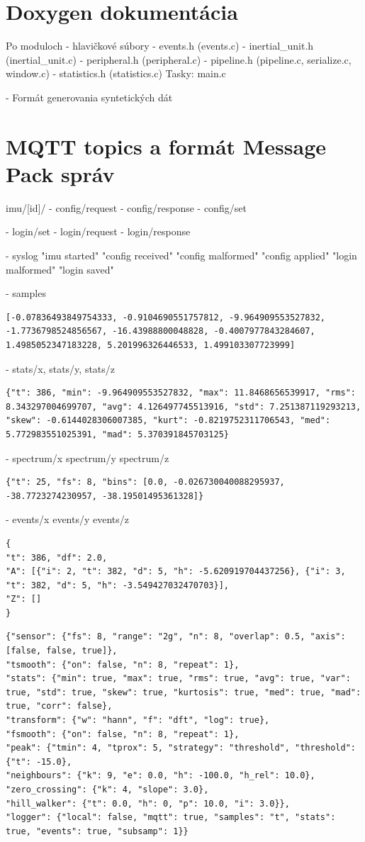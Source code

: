 \section{Doxygen dokumentácia}
Po moduloch - hlavičkové súbory
- events.h  (events.c)
- inertial\_unit.h (inertial\_unit.c)
- peripheral.h  (peripheral.c)
- pipeline.h (pipeline.c, serialize.c, window.c)
- statistics.h (statistics.c)
Tasky: main.c

- Formát generovania syntetických dát

\section{MQTT topics a formát Message Pack správ}
imu/[id]/
- config/request
- config/response
- config/set

- login/set
- login/request
- login/response

- syslog
	"imu started"
	"config received"
	"config malformed"
	"config applied"
	"login malformed"
	"login saved"

- samples
\begin{verbatim}
[-0.07836493849754333, -0.9104690551757812, -9.964909553527832, -1.7736798524856567, -16.43988800048828, -0.4007977843284607, 1.4985052347183228, 5.201996326446533, 1.499103307723999]
\end{verbatim}

- stats/x, stats/y, stats/z
\begin{verbatim}
{"t": 386, "min": -9.964909553527832, "max": 11.8468656539917, "rms": 8.343297004699707, "avg": 4.126497745513916, "std": 7.251387119293213, "skew": -0.6144028306007385, "kurt": -0.8219752311706543, "med": 5.772983551025391, "mad": 5.370391845703125}
\end{verbatim}

- spectrum/x spectrum/y  spectrum/z
\begin{verbatim}
{"t": 25, "fs": 8, "bins": [0.0, -0.026730040088295937, -38.7723274230957, -38.19501495361328]}
\end{verbatim}

- events/x events/y events/z
\begin{verbatim}
{
"t": 386, "df": 2.0, 
"A": [{"i": 2, "t": 382, "d": 5, "h": -5.620919704437256}, {"i": 3, "t": 382, "d": 5, "h": -3.549427032470703}], 
"Z": []
}
\end{verbatim}

\begin{verbatim}
{"sensor": {"fs": 8, "range": "2g", "n": 8, "overlap": 0.5, "axis": [false, false, true]}, 
"tsmooth": {"on": false, "n": 8, "repeat": 1}, 
"stats": {"min": true, "max": true, "rms": true, "avg": true, "var": true, "std": true, "skew": true, "kurtosis": true, "med": true, "mad": true, "corr": false}, 
"transform": {"w": "hann", "f": "dft", "log": true},
"fsmooth": {"on": false, "n": 8, "repeat": 1},
"peak": {"tmin": 4, "tprox": 5, "strategy": "threshold", "threshold": {"t": -15.0},
"neighbours": {"k": 9, "e": 0.0, "h": -100.0, "h_rel": 10.0}, 
"zero_crossing": {"k": 4, "slope": 3.0}, 
"hill_walker": {"t": 0.0, "h": 0, "p": 10.0, "i": 3.0}}, 
"logger": {"local": false, "mqtt": true, "samples": "t", "stats": true, "events": true, "subsamp": 1}}
\end{verbatim}


